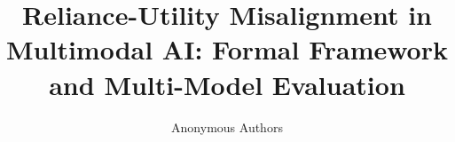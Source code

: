 \documentclass[graybox]{svmult}
\begin{document}
\raggedbottom

\title*{Reliance-Utility Misalignment in Multimodal AI: Formal Framework and Multi-Model Evaluation}

\newif\ifanon
\anontrue   %

\ifanon
  \author{Anonymous Authors}
\else
  \author{Mohammed Farhan Siddiqui and Uma Rani}
  \authorrunning{M. F. Siddiqui and U. Rani}
  \institute{Mohammed Farhan Siddiqui \at Department of Computer Science, ADGIPS,
  New Delhi, India, \\ \email{MohammedFarhan678@outlook.com}
  \and Uma Rani (corresponding author) \at Department of Computer Science,
  ADGIPS, New Delhi, India, \\ \email{dr.uma@adgips.ac.in}}
\fi

\maketitle













\end{document}

